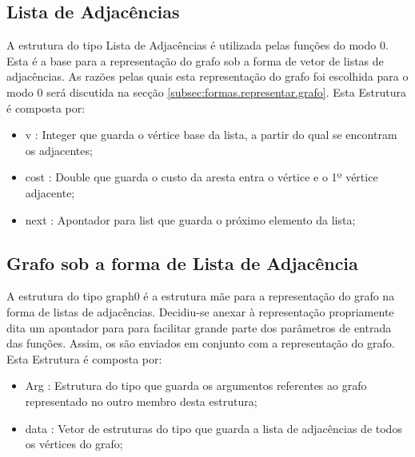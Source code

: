 \documentclass[14pt]{article}
\begin{document}
    \subsection[list]{Lista de Adjacências}\label{subsec:l.adj} 
    A estrutura do tipo Lista de Adjacências é utilizada pelas funções do modo 0.
    Esta é a base para a representação do grafo sob a forma de vetor de listas de adjacências.
    As razões pelas quais esta representação do grafo foi escolhida para o modo 0 será discutida na secção \ref{subsec:formas.representar.grafo}.
    Esta Estrutura é composta por:
    \begin{itemize}
        \item v : Integer que guarda o vértice base da lista, a partir do qual se encontram os adjacentes;
        \item cost : Double que guarda o custo da aresta entra o vértice e o 1º vértice adjacente;
        \item next : Apontador para list que guarda o próximo elemento da lista;
    \end{itemize}

    \subsection[graph0]{Grafo sob a forma de Lista de Adjacência}\label{subsec:grafo.l.adj} 
    A estrutura do tipo graph0 é a estrutura mãe para a representação do grafo na forma de listas de adjacências.
    Decidiu-se anexar à representação propriamente dita um apontador para  para
    facilitar grande parte dos parâmetros de entrada das funções.
    Assim, os  são enviados em conjunto com a representação do grafo.
    Esta Estrutura é composta por:
    \begin{itemize}
        \item Arg : Estrutura do tipo  que guarda os argumentos referentes ao grafo
        representado no outro membro desta estrutura;
        \item data : Vetor de estruturas do tipo  que guarda a lista de adjacências de todos os
        vértices do grafo;
    \end{itemize}
\end{document}
